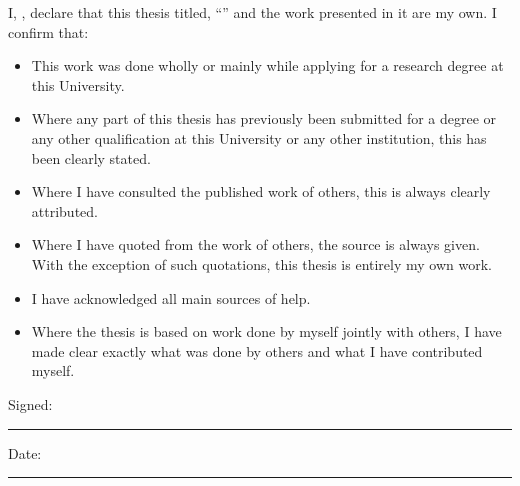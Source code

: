   
  \begin{declaration}
  \addchaptertocentry{\authorshipname} %
  \noindent I, \authorname, declare that this thesis titled, \enquote{\ttitle} and the work presented in it are my own. I confirm that:
  
  \begin{itemize} 
  \item This work was done wholly or mainly while applying for a research degree at this University.
  \item Where any part of this thesis has previously been submitted for a degree or any other qualification at this University or any other institution, this has been clearly stated.
  \item Where I have consulted the published work of others, this is always clearly attributed.
  \item Where I have quoted from the work of others, the source is always given. With the exception of such quotations, this thesis is entirely my own work.
  \item I have acknowledged all main sources of help.
  \item Where the thesis is based on work done by myself jointly with others, I have made clear exactly what was done by others and what I have contributed myself.
  \end{itemize}
   
  \noindent Signed:\\
  \rule[0.5em]{25em}{0.5pt} %
   
  \noindent Date:\\
  \rule[0.5em]{25em}{0.5pt} %
  \end{declaration}